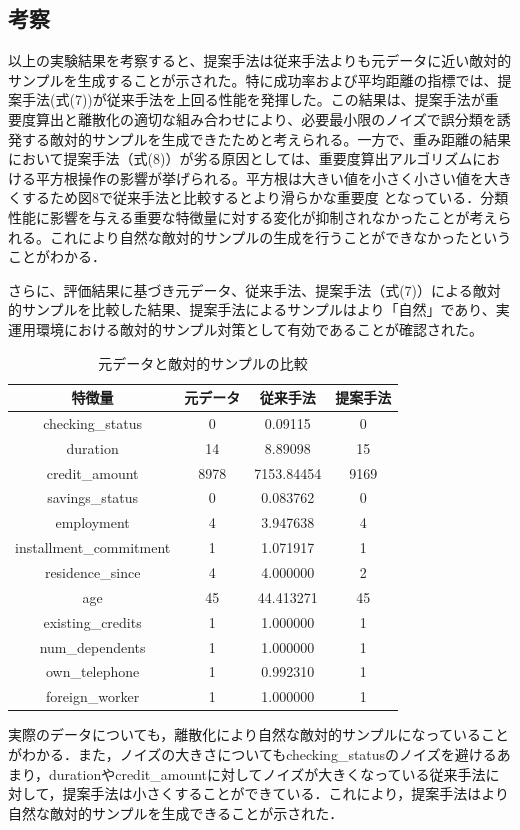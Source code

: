 \subsection{考察}
以上の実験結果を考察すると、提案手法は従来手法よりも元データに近い敵対的サンプルを生成することが示された。特に成功率および平均距離の指標では、提案手法(式(7))が従来手法を上回る性能を発揮した。この結果は、提案手法が重要度算出と離散化の適切な組み合わせにより、必要最小限のノイズで誤分類を誘発する敵対的サンプルを生成できたためと考えられる。一方で、重み距離の結果において提案手法（式(8)）が劣る原因としては、重要度算出アルゴリズムにおける平方根操作の影響が挙げられる。平方根は大きい値を小さく小さい値を大きくするため図8で従来手法と比較するとより滑らかな重要度
となっている．分類性能に影響を与える重要な特徴量に対する変化が抑制されなかったことが考えられる。これにより自然な敵対的サンプルの生成を行うことができなかったということがわかる．

さらに、評価結果に基づき元データ、従来手法、提案手法（式(7)）による敵対的サンプルを比較した結果、提案手法によるサンプルはより「自然」であり、実運用環境における敵対的サンプル対策として有効であることが確認された。

\begin{table}[H]
    \centering
    \caption{元データと敵対的サンプルの比較}
    \begin{tabular}{|c|c|c|c|} \hline
        特徴量 & 元データ & 従来手法 & 提案手法 \\ \hline
        checking\_status & 0 & 0.09115 & 0\\ \hline
        duration & 14 & 8.89098 & 15 \\ \hline
        credit\_amount & 8978 & 7153.84454 & 9169 \\ \hline
        savings\_status & 0 & 0.083762 & 0\\ \hline
        employment & 4 & 3.947638  & 4 \\ \hline
        installment\_commitment & 1 & 1.071917 & 1\\ \hline
        residence\_since & 4 & 4.000000 & 2 \\ \hline
        age & 45 & 44.413271 & 45 \\ \hline
        existing\_credits & 1 & 1.000000 & 1 \\ \hline
        num\_dependents & 1 & 1.000000 & 1 \\ \hline
        own\_telephone & 1 & 0.992310 & 1 \\ \hline
        foreign\_worker & 1 & 1.000000 & 1 \\ \hline
    \end{tabular}
\end{table}

実際のデータについても，離散化により自然な敵対的サンプルになっていることがわかる．また，ノイズの大きさについてもchecking\_statusのノイズを避けるあまり，durationやcredit\_amountに対してノイズが大きくなっている従来手法に対して，提案手法は小さくすることができている．これにより，提案手法はより自然な敵対的サンプルを生成できることが示された．